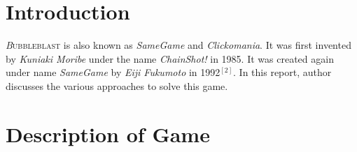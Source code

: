 \documentclass[twoside]{article}
\begin{document}
\begin{multicols}{2} %

\section{Introduction}

\lettrine[nindent=0em,lines=3]{\textit{B}} {ubbleblast} is also known as \textit{SameGame} and \textit{Clickomania}. It was first invented by \textit{Kuniaki Moribe} under the name \textit{ChainShot!} in 1985. It was created again under name \textit{SameGame} by \textit{Eiji Fukumoto} in 1992$^{[2]}$. In this report, author discusses the various approaches to solve this game.%


\section{Description of Game}


\end{multicols}
\end{document}
